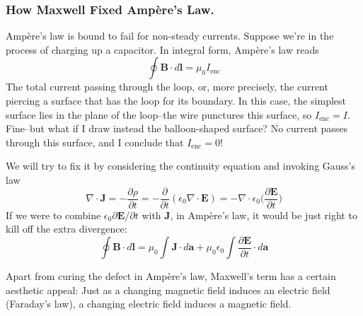 \documentclass[../../../main.tex]{subfiles}
\begin{document}
\subsubsection{How Maxwell Fixed Ampère’s Law.} Ampère’s law is bound to fail for non-steady currents. Suppose we’re in the process of charging up a capacitor. In integral form, Ampère’s law reads
\begin{equation*}
    \oint \mathbf{B}\cdot d\mathbf{l}=\mu_0 I_\text{enc}
\end{equation*}
The total current passing through the loop, or, more precisely, the current piercing a surface that has the loop for its boundary. In this case, the simplest surface lies in the plane of the loop--the wire punctures this surface, so $I_\text{enc} = I$. Fine--but what if I draw instead the balloon-shaped surface? No current passes through this surface, and I conclude that $I_\text{enc} = 0$!

We will try to fix it by considering the continuity equation and  invoking Gauss's law
\begin{equation*}
    \nabla\cdot\mathbf{J}=-\frac{\partial \rho}{\partial t}=-\frac{\partial }{\partial t}(\epsilon_0 \nabla\cdot \mathbf{E})=-\nabla\cdot\epsilon_0\biggl(\frac{\partial \mathbf{E}}{\partial t}\biggr)
\end{equation*}
If we were to combine $\epsilon_0 \partial \mathbf{E}/\partial t$ with \textbf{J}, in Ampère’s law, it would be just right to kill off the extra divergence:
\begin{equation*}
    \oint \mathbf{B}\cdot d\mathbf{l} =\mu_0\int\mathbf{J}\cdot d\mathbf{a}+ \mu_0\epsilon_0 \int\frac{\partial \mathbf{E}}{\partial t}\cdot d\mathbf{a}
\end{equation*}

Apart from curing the defect in Ampère’s law, Maxwell’s term has a certain aesthetic appeal: Just as a changing magnetic ﬁeld induces an electric ﬁeld (Faraday’s law), a changing electric ﬁeld induces a magnetic ﬁeld.
\end{document}
